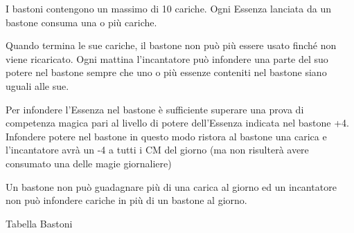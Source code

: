 \documentclass[a4paper,11pt,twoside,openany]{book}
\begin{document}
I bastoni contengono un massimo di 10 cariche. Ogni Essenza lanciata
da un bastone consuma una o più cariche.

Quando termina le sue cariche, il bastone non può più essere usato finché non viene ricaricato. Ogni mattina l'incantatore può infondere una parte del suo potere nel bastone sempre che uno o più essenze conteniti nel bastone siano uguali alle sue.

Per infondere l'Essenza nel bastone è sufficiente superare una prova di competenza magica pari al livello di potere dell'Essenza indicata nel bastone +4. Infondere potere nel bastone in questo modo ristora al bastone una carica e l'incantatore avrà un -4 a tutti i CM del giorno (ma non risulterà avere consumato una delle magie giornaliere)

Un bastone non può guadagnare più di una carica al giorno ed un incantatore non può infondere cariche in più di un bastone al giorno.

\bigskip

Tabella Bastoni
\end{document}

